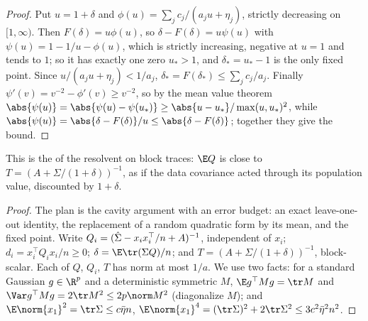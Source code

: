 \begin{refsection}

\begin{proof}
Put $u=1+\delta$ and $\phi(u)=\sum_jc_j/(a_ju+\eta_j)$, strictly decreasing on $[1,\infty)$. Then $F(\delta)=u\phi(u)$, so $\delta-F(\delta)=u\psi(u)$ with $\psi(u)=1-1/u-\phi(u)$, which is strictly increasing, negative at $u=1$ and tends to $1$; so it has exactly one zero $u_*>1$, and $\delta_*=u_*-1$ is the only fixed point. Since $u/(a_ju+\eta_j)<1/a_j$, $\delta_*=F(\delta_*)\le\sum_jc_j/a_j$. Finally $\psi'(v)=v^{-2}-\phi'(v)\ge v^{-2}$, so by the mean value theorem $\abs{\psi(u)}=\abs{\psi(u)-\psi(u_*)}\ge\abs{u-u_*}/\max(u,u_*)^2$, while $\abs{\psi(u)}=\abs{\delta-F(\delta)}/u\le\abs{\delta-F(\delta)}$; together they give the bound.
\end{proof}


This is the  of the resolvent on block traces: $\E Q$ is close to $T=(A+\Sigma/(1+\delta))^{-1}$, as if the data covariance acted through its population value, discounted by $1+\delta$.

\begin{proof}
The plan is the cavity argument with an error budget: an exact leave-one-out identity, the replacement of a random quadratic form by its mean, and the fixed point. Write $Q_i=(\hat\Sigma-x_ix_i^\top/n+A)^{-1}$, independent of $x_i$; $d_i=x_i^\top Q_ix_i/n\ge0$; $\delta=\E\tr(\Sigma Q)/n$; and $T=(A+\Sigma/(1+\delta))^{-1}$, block-scalar. Each of $Q$, $Q_i$, $T$ has norm at most $1/a$. We use two facts: for a standard Gaussian $g\in\R^p$ and a deterministic symmetric $M$, $\E g^\top Mg=\tr M$ and $\Var g^\top Mg=2\tr M^2\le2p\norm M^2$ (diagonalize $M$); and $\E\norm{x_1}^2=\tr\Sigma\le c\bar\eta n$, $\E\norm{x_1}^4=(\tr\Sigma)^2+2\tr\Sigma^2\le3c^2\bar\eta^2n^2$.


\end{proof}
\end{refsection}
